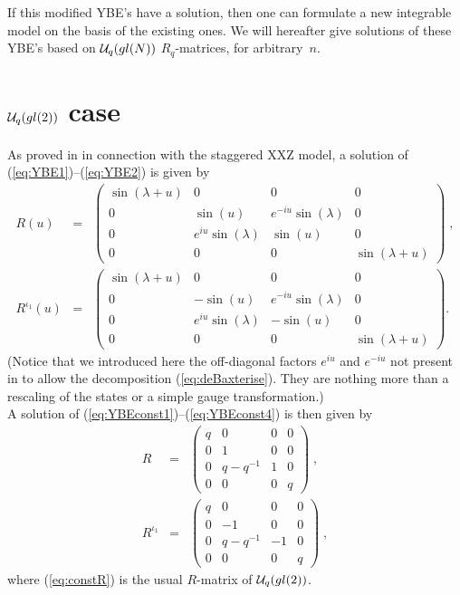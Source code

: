 \documentclass[a4paper,a4paper]{article}
\begin{document}
If this modified YBE's have a solution, then one can formulate
a new integrable model on the basis of the existing ones. 
We will hereafter give solutions of these YBE's based on  ${\cal U}_q(gl(N))$
$R_q$-matrices, for arbitrary~$n$.

\section{${\cal U}_q(gl(2))$ case\label{sect:gl2case}}
\setcounter{equation}{0}

\indent

As proved in \cite{APSS} in connection with the staggered XXZ model, a
solution of (\ref{eq:YBE1})--(\ref{eq:YBE2}) is given by 
\begin{eqnarray}
  \label{eq:R}
  R(u) &=& 
  \left(\begin{array}{llll}
      \sin(\lambda +u) & 0 & 0 & 0 \\
      0 & \sin(u) & e^{-iu}\sin(\lambda)  & 0 \\
      0 & e^{iu}\sin(\lambda) & \sin(u) & 0 \\
      0 & 0 & 0 & \sin(\lambda +u)
    \end{array}\right) \;,\\[4mm]
  R^{\iota_1}(u) &=& 
  \left(\begin{array}{llll}
      \sin(\lambda +u) & 0 & 0 & 0 \\
      0 & -\sin(u) & e^{-iu}\sin(\lambda)  & 0 \\
      0 & e^{iu}\sin(\lambda) & -\sin(u) & 0 \\
      0 & 0 & 0 & \sin(\lambda +u)
    \end{array}\right).
\end{eqnarray}
(Notice that we introduced here the off-diagonal factors $e^{iu}$ and
$e^{-iu}$  not present in \cite{APSS} to allow the
decomposition (\ref{eq:deBaxterise}). They are nothing more than a rescaling
of the states or a simple gauge transformation.)
\\
A solution of
(\ref{eq:YBEconst1})--(\ref{eq:YBEconst4}) is then
given by 
\begin{eqnarray}
  \label{eq:constR}
  R &=& 
  \left(\begin{array}{llll}
      q & 0 & 0 & 0 \\
      0 & 1 & 0  & 0 \\
      0 & q-q^{-1} & 1 & 0 \\
      0 & 0 & 0 & q
    \end{array}\right) \;,\\[4mm]
  R^{\iota_1} &=& 
  \label{eq:constRi1}
  \left(\begin{array}{llll}
      q & 0 & 0 & 0 \\
      0 & -1 & 0  & 0 \\
      0 & q-q^{-1} & -1 & 0 \\
      0 & 0 & 0 & q
    \end{array}\right) \;,
\end{eqnarray}
where (\ref{eq:constR}) is the usual $R$-matrix of ${\cal U}_q(gl(2))$.
\end{document}
